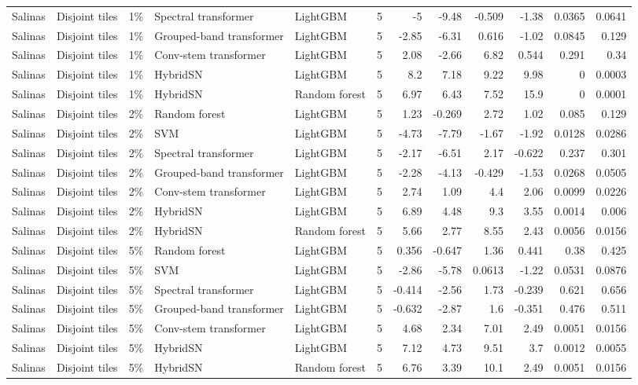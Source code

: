 \begin{table}
\begin{tabular}{lllllrrrrrrr}
Salinas & Disjoint tiles & 1\% & Spectral transformer & LightGBM & 5 & -5 & -9.48 & -0.509 & -1.38 & 0.0365 & 0.0641 \\
Salinas & Disjoint tiles & 1\% & Grouped-band transformer & LightGBM & 5 & -2.85 & -6.31 & 0.616 & -1.02 & 0.0845 & 0.129 \\
Salinas & Disjoint tiles & 1\% & Conv-stem transformer & LightGBM & 5 & 2.08 & -2.66 & 6.82 & 0.544 & 0.291 & 0.34 \\
Salinas & Disjoint tiles & 1\% & HybridSN & LightGBM & 5 & 8.2 & 7.18 & 9.22 & 9.98 & 0 & 0.0003 \\
Salinas & Disjoint tiles & 1\% & HybridSN & Random forest & 5 & 6.97 & 6.43 & 7.52 & 15.9 & 0 & 0.0001 \\
Salinas & Disjoint tiles & 2\% & Random forest & LightGBM & 5 & 1.23 & -0.269 & 2.72 & 1.02 & 0.085 & 0.129 \\
Salinas & Disjoint tiles & 2\% & SVM & LightGBM & 5 & -4.73 & -7.79 & -1.67 & -1.92 & 0.0128 & 0.0286 \\
Salinas & Disjoint tiles & 2\% & Spectral transformer & LightGBM & 5 & -2.17 & -6.51 & 2.17 & -0.622 & 0.237 & 0.301 \\
Salinas & Disjoint tiles & 2\% & Grouped-band transformer & LightGBM & 5 & -2.28 & -4.13 & -0.429 & -1.53 & 0.0268 & 0.0505 \\
Salinas & Disjoint tiles & 2\% & Conv-stem transformer & LightGBM & 5 & 2.74 & 1.09 & 4.4 & 2.06 & 0.0099 & 0.0226 \\
Salinas & Disjoint tiles & 2\% & HybridSN & LightGBM & 5 & 6.89 & 4.48 & 9.3 & 3.55 & 0.0014 & 0.006 \\
Salinas & Disjoint tiles & 2\% & HybridSN & Random forest & 5 & 5.66 & 2.77 & 8.55 & 2.43 & 0.0056 & 0.0156 \\
Salinas & Disjoint tiles & 5\% & Random forest & LightGBM & 5 & 0.356 & -0.647 & 1.36 & 0.441 & 0.38 & 0.425 \\
Salinas & Disjoint tiles & 5\% & SVM & LightGBM & 5 & -2.86 & -5.78 & 0.0613 & -1.22 & 0.0531 & 0.0876 \\
Salinas & Disjoint tiles & 5\% & Spectral transformer & LightGBM & 5 & -0.414 & -2.56 & 1.73 & -0.239 & 0.621 & 0.656 \\
Salinas & Disjoint tiles & 5\% & Grouped-band transformer & LightGBM & 5 & -0.632 & -2.87 & 1.6 & -0.351 & 0.476 & 0.511 \\
Salinas & Disjoint tiles & 5\% & Conv-stem transformer & LightGBM & 5 & 4.68 & 2.34 & 7.01 & 2.49 & 0.0051 & 0.0156 \\
Salinas & Disjoint tiles & 5\% & HybridSN & LightGBM & 5 & 7.12 & 4.73 & 9.51 & 3.7 & 0.0012 & 0.0055 \\
Salinas & Disjoint tiles & 5\% & HybridSN & Random forest & 5 & 6.76 & 3.39 & 10.1 & 2.49 & 0.0051 & 0.0156 \\
\bottomrule
\end{tabular}
\end{table}
